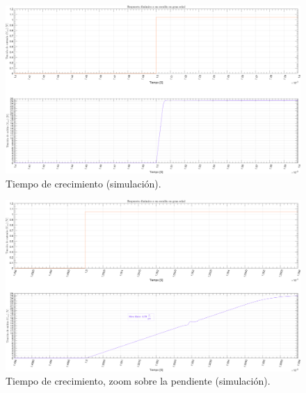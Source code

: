 \begin{figure}[H]
    \centering
    \includegraphics[height=0.66 \textwidth, angle=90]{./img/simulaciones/Slew_Rate/Slew_Rate.png}
    \caption{Tiempo de crecimiento (simulación).}
    \label{fig:Slew_Rate}
\end{figure}

\clearpage

\begin{figure}[H]
    \centering
    \includegraphics[height=0.66 \textwidth, angle=90]{./img/simulaciones/Slew_Rate/amplifier_SR_zoom.png}
    \caption{Tiempo de crecimiento, zoom sobre la pendiente  (simulación).}
    \label{fig:Slew_Rate_zoom}
\end{figure}

\clearpage